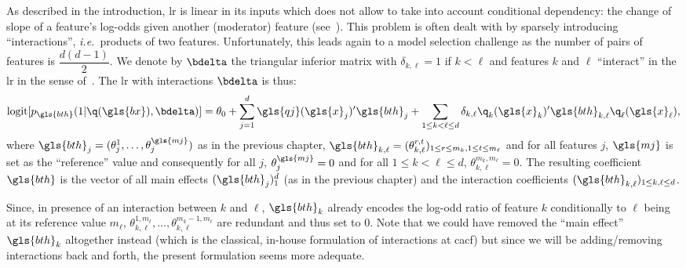 As described in the introduction, \gls{lr} is linear in its inputs which does not allow to take into account conditional dependency: the change of slope of a feature's log-odds given another (moderator) feature (see~\cite{berry2010testing}). This problem is often dealt with by sparsely introducing ``interactions'', \textit{i.e.}\ products of two features. Unfortunately, this leads again to a model selection challenge as the number of pairs of features is $\dfrac{d(d-1)}{2}$. We denote by $\bdelta$ the triangular inferior matrix with $\delta_{k,\ell} = 1$ if $k < \ell$ and features $k$ and $\ell$ ``interact'' in the \gls{lr} in the sense of~\cite{berry2010testing}. The \gls{lr} with interactions $\bdelta$ is thus:
\begin{equation} \label{eq:reglog_sans}
\text{logit}[p_{\gls{bth}}(1|\q(\gls{bx}),\bdelta)] = \theta_{0} + \sum_{j=1}^d \gls{qj}(\gls{x}_j)' \gls{bth}_j + \sum_{1 \leq k < \ell \leq d} \delta_{k,\ell} \q_k(\gls{x}_k)' \gls{bth}_{k,\ell} \q_\ell(\gls{x}_\ell),
\end{equation}
where $\gls{bth}_{j} = (\theta_j^1, \dots, \theta_j^{\gls{mj}})$ as in the previous chapter, $\gls{bth}_{k,\ell} = (\theta_{k,\ell}^{r,t})_{1 \leq r \leq m_k, 1 \leq t \leq m_\ell}$ and for all features $j$, $\gls{mj}$ is set as the ``reference'' value and consequently for all $j$, $\theta_{j}^{\gls{mj}}=0$ and for all $1 \leq k < \ell \leq d$, $\theta_{k,\ell}^{m_k,m_{\ell}}=0$. The resulting coefficient $\gls{bth}$ is the vector of all main effects $(\gls{bth}_j)_1^d$ (as in the previous chapter) and the interaction coefficients $(\gls{bth}_{k,\ell})_{1 \leq k,\ell \leq d}$.

Since, in presence of an interaction between $k$ and $\ell$, $\gls{bth}_{k}$ already encodes the log-odd ratio of feature $k$ conditionally to $\ell$ being at its reference value $m_\ell$, $\theta_{k,\ell}^{1,m_\ell},\dots,\theta_{k,\ell}^{m_k-1,m_\ell}$ are redundant and thus set to $0$. Note that we could have removed the ``main effect'' $\gls{bth}_k$ altogether instead (which is the classical, in-house formulation of interactions at \gls{cacf}) but since we will be adding/removing interactions back and forth, the present formulation seems more adequate.

